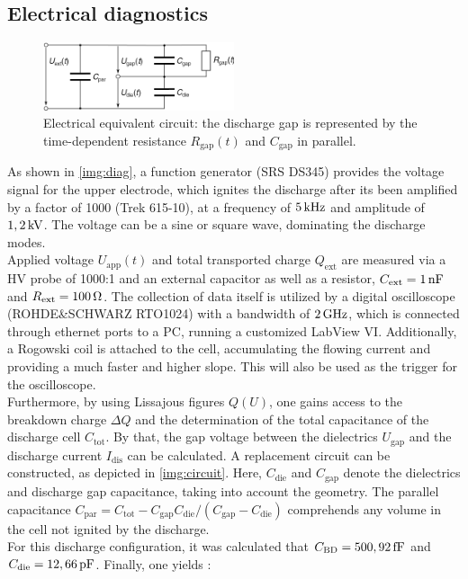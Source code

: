 \documentclass[a4paper,10pt,twoside]{article}
\newcommand{\ix}[1]{_\text{#1}}
\begin{document}
		\subsection{Electrical diagnostics}\label{subsec:electric}
		
				\begin{figure}
					\centering
					\includegraphics[width=0.5\textwidth]{figures/setup/replacementcircuit}
					\caption{Electrical equivalent circuit: the discharge gap is represented by the time-dependent resistance $R\ix{gap}(t)$ and $C\ix{gap}$ in parallel.}
					\label{img:circuit}
				\end{figure}
		
					 
			 As shown in \autoref{img:diag}, a function generator (SRS DS345) provides the voltage signal for the upper electrode, which ignites the discharge after its been amplified by a factor of 1000 (Trek 615-10), at a frequency of $\unit[5]{kHz}$ and amplitude of $\unit[1,2]{kV}$. The voltage can be a sine or square wave, dominating the discharge modes.\\
			 Applied voltage $U\ix{app}(t)$ and total transported charge $Q\ix{ext}$ are measured via a HV probe of 1000:1 and an external capacitor as well as a resistor, $C\ix{ext}=\unit[1]{nF}$ and $R\ix{ext}=\unit[100]{\Omega}$. The collection of data itself is utilized by a digital oscilloscope (ROHDE\&SCHWARZ RTO1024) with a bandwidth of $\unit[2]{GHz}$, which is connected through ethernet ports to a PC, running a customized LabView VI. Additionally, a Rogowski coil is attached to the cell, accumulating the flowing current and providing a much faster and higher slope. This will also be used as the trigger for the oscilloscope.\\
			 Furthermore, by using Lissajous figures $Q(U)$, one gains access to the breakdown charge $\Delta Q$ and the determination of the total capacitance of the discharge cell $C\ix{tot}$. By that, the gap voltage between the dielectrics $U\ix{gap}$ and the discharge current $I\ix{dis}$ can be calculated. A replacement circuit can be constructed, as depicted in \autoref{img:circuit}. Here, $C\ix{die}$ and $C\ix{gap}$ denote the dielectrics and discharge gap capacitance, taking into account the geometry. The parallel capacitance $C\ix{par}=C\ix{tot}-C\ix{gap}C\ix{die}/\left(C\ix{gap}-C\ix{die}\right)$ comprehends any volume in the cell not ignited by the discharge.\\
			 For this discharge configuration, it was calculated that $C\ix{BD}=\unit[500,92]{fF}$ and $C\ix{die}=\unit[12,66]{pF}$. Finally, one yields \cite{Kogelschatz2003}:
			 
\end{document}
